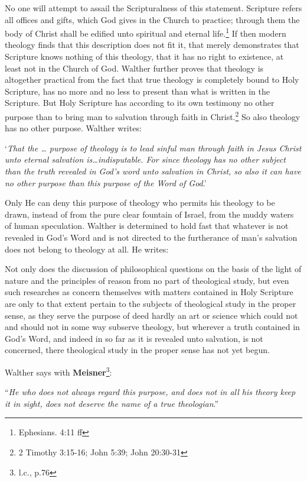 No one will attempt to assail the Scripturalness of this statement.  Scripture refers all offices and gifts, which God gives in the Church to practice; through them the body of Christ shall be edified unto spiritual and eternal life.\footnote{Ephesians. 4:11 ff}  If then modern theology finds that this description does not fit it, that merely demonstrates that Scripture knows nothing of this theology, that it has no right to existence, at least not in the Church of God. Walther further proves that theology is altogether practical from the fact that true theology is completely bound to Holy Scripture, has no more and no less to present than what is written in the Scripture.  But Holy Scripture has according to its own testimony no other purpose than to bring man to salvation through faith in Christ.\footnote{2 Timothy 3:15-16; John 5:39; John 20:30-31}  So also theology has no other purpose.  Walther writes:  \begin{displayquote}`\textit{That the … purpose of theology is to lead sinful man through faith in Jesus Christ unto eternal salvation is…indisputable.  For since theology has no other subject than the truth revealed in God’s word unto salvation in Christ, so also it can have no other purpose than this purpose of the Word of God}.'\end{displayquote}  Only He can deny this purpose of theology who permits his theology to be drawn, instead of from the pure clear fountain of Israel, from the muddy waters of human speculation.  Walther is determined to hold fast that whatever is not revealed in God’s Word and is not directed to the furtherance of man’s salvation does not belong to theology at all.  He writes: \begin{fancyquotes} Not only does the discussion of philosophical questions on the basis of the light of nature and the principles of reason from no part of theological study, but even such researches as concern themselves with matters contained in Holy Scripture are only to that extent pertain to the subjects of theological study in the proper sense, as they serve the purpose of deed hardly an art or science which could not and should not in some way subserve theology, but wherever a truth contained in God’s Word, and indeed in so far as it is revealed unto salvation, is not concerned, there theological study in the proper sense has not yet begun.\end{fancyquotes}  Walther says with \textbf{Meisner}\footnote{l.c., p.76}:  \begin{displayquote}“\textit{He who does not always regard this purpose, and does not in all his theory keep it in sight, does not deserve the name of a true theologian}.”\end{displayquote}


